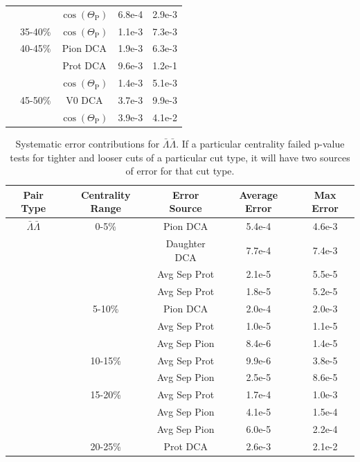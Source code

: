 \begin{table}
\begin{center}
\begin{tabular}{| c | c | c | c | c |}
   &         & $\cos(\Theta_{\mathrm{P}})$ & 6.8e-4 & 2.9e-3 \\
   & 35-40\% & $\cos(\Theta_{\mathrm{P}})$ & 1.1e-3 & 7.3e-3 \\
   & 40-45\% & Pion DCA & 1.9e-3 & 6.3e-3 \\
   &         & Prot DCA & 9.6e-3 & 1.2e-1 \\
   &         & $\cos(\Theta_{\mathrm{P}})$ & 1.4e-3 & 5.1e-3 \\ 
   & 45-50\% & V0 DCA & 3.7e-3 & 9.9e-3 \\
   &         & $\cos(\Theta_{\mathrm{P}})$ & 3.9e-3 & 4.1e-2 \\
   \hline
\end{tabular}
\end{center}
\end{table}
\begin{table}
\caption[Systematic error contributions for $\bar{\Lambda}\bar{\Lambda}$] {Systematic error contributions for $\bar{\Lambda}\bar{\Lambda}$.  If a particular centrality failed p-value tests for tighter and looser cuts of a particular cut type, it will have two sources of error for that cut type.} \label{tab:SysErrorSourcesAA} 
\begin{center}
\begin{tabular}{| c | c | c | c | c |}
  \hline                         
  Pair Type & Centrality Range & Error Source & Average Error & Max Error \\
  \hline 
  $\bar{\Lambda}\bar{\Lambda}$ & 0-5\% & Pion DCA & 5.4e-4 & 4.6e-3 \\
   &        & Daughter DCA & 7.7e-4 & 7.4e-3 \\
   &        & Avg Sep Prot & 2.1e-5 & 5.5e-5 \\
   &         & Avg Sep Prot & 1.8e-5 & 5.2e-5 \\
   & 5-10\% & Pion DCA & 2.0e-4 & 2.0e-3 \\
   &         & Avg Sep Prot & 1.0e-5 & 1.1e-5 \\
   &         & Avg Sep Pion & 8.4e-6 & 1.4e-5 \\
   & 10-15\% & Avg Sep Prot & 9.9e-6 & 3.8e-5 \\
   &         & Avg Sep Pion & 2.5e-5 & 8.6e-5 \\
   & 15-20\% & Avg Sep Prot & 1.7e-4 & 1.0e-3 \\
   &         & Avg Sep Pion & 4.1e-5 & 1.5e-4 \\
   &         & Avg Sep Pion & 6.0e-5 & 2.2e-4 \\
   & 20-25\% & Prot DCA & 2.6e-3 & 2.1e-2 \\

\end{tabular}
\end{center}
\end{table}
